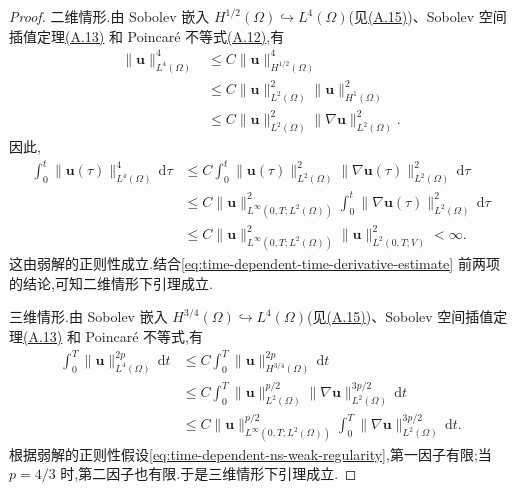 \begin{lemma}[时间导数的正则性]
\begin{proof}
二维情形.由 Sobolev 嵌入 $H^{1/2}(\Omega)\hookrightarrow L^4(\Omega)$(见\hyperref[eq:appendix-a-15]{(A.15)})、Sobolev 空间插值定理\hyperref[eq:appendix-a-13]{(A.13)} 和 Poincaré 不等式\hyperref[eq:appendix-a-12]{(A.12)},有
\[
\begin{aligned}
  \|\bm{u}\|_{L^4(\Omega)}^4
  &\le C\|\bm{u}\|_{H^{1/2}(\Omega)}^4\\
  &\le C\|\bm{u}\|_{L^2(\Omega)}^2
           \|\bm{u}\|_{H^1(\Omega)}^2\\
  &\le C\|\bm{u}\|_{L^2(\Omega)}^2
           \|\nabla\bm{u}\|_{L^2(\Omega)}^2.
\end{aligned}
\]
因此,
\begin{equation}\label{eq:time-dependent-time-derivative-two-dimensional}
\begin{aligned}
  \int_0^t\|\bm{u}(\tau)\|_{L^4(\Omega)}^4\,\mathrm{d}\tau
  &\le C\int_0^t\|\bm{u}(\tau)\|_{L^2(\Omega)}^2
                  \|\nabla\bm{u}(\tau)\|_{L^2(\Omega)}^2\,\mathrm{d}\tau\\
  &\le C\|\bm{u}\|_{L^\infty(0,T;L^2(\Omega))}^2
       \int_0^t\|\nabla\bm{u}(\tau)\|_{L^2(\Omega)}^2\,\mathrm{d}\tau\\
  &\le C\|\bm{u}\|_{L^\infty(0,T;L^2(\Omega))}^2
       \|\bm{u}\|_{L^2(0,T;V)}^2<\infty.
\end{aligned}
\end{equation}
这由弱解的正则性成立.结合\cref{eq:time-dependent-time-derivative-estimate} 前两项的结论,可知二维情形下引理成立.

三维情形.由 Sobolev 嵌入 $H^{3/4}(\Omega)\hookrightarrow L^4(\Omega)$(见\hyperref[eq:appendix-a-15]{(A.15)})、Sobolev 空间插值定理\hyperref[eq:appendix-a-13]{(A.13)} 和 Poincaré 不等式,有
\begin{equation}\label{eq:time-dependent-time-derivative-three-dimensional}
\begin{aligned}
  \int_0^T\|\bm{u}\|_{L^4(\Omega)}^{2p}\,\mathrm{d}t
  &\le C\int_0^T\|\bm{u}\|_{H^{3/4}(\Omega)}^{2p}\,\mathrm{d}t\\
  &\le C\int_0^T\|\bm{u}\|_{L^2(\Omega)}^{p/2}
                  \|\nabla\bm{u}\|_{L^2(\Omega)}^{3p/2}\,\mathrm{d}t\\
  &\le C\|\bm{u}\|_{L^\infty(0,T;L^2(\Omega))}^{p/2}
       \int_0^T\|\nabla\bm{u}\|_{L^2(\Omega)}^{3p/2}\,\mathrm{d}t.
\end{aligned}
\end{equation}
根据弱解的正则性假设\cref{eq:time-dependent-ns-weak-regularity},第一因子有限;当 $p=4/3$ 时,第二因子也有限.于是三维情形下引理成立.
\end{proof}
\end{lemma}

